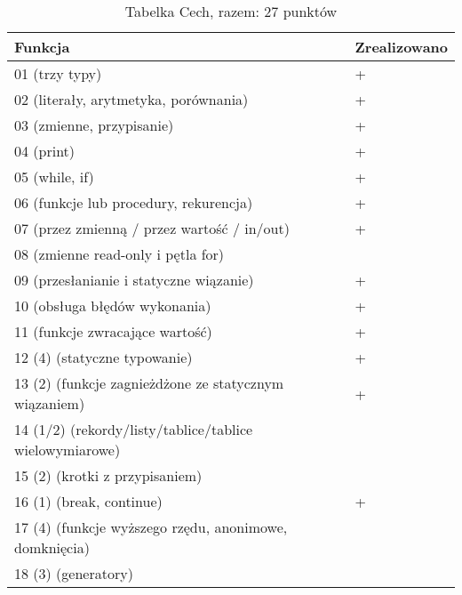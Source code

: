\documentclass[12pt]{article}
\begin{document}
\begin{table}[h]
    \centering
    \begin{tabular}{@{}ll@{}}
    \toprule
    Funkcja                                                          & Zrealizowano \\ \midrule
    01 (trzy typy)                                                   & +            \\
    02 (literały, arytmetyka, porównania)                            & +            \\
    03 (zmienne, przypisanie)                                        & +            \\
    04 (print)                                                       & +            \\
    05 (while, if)                                                   & +            \\
    06 (funkcje lub procedury, rekurencja)                           & +            \\
    07 (przez zmienną / przez wartość / in/out)                      & +            \\
    08 (zmienne read-only i pętla for)                               &              \\
    09 (przesłanianie i statyczne wiązanie)                          & +            \\
    10 (obsługa błędów wykonania)                                    & +            \\
    11 (funkcje zwracające wartość)                                  & +            \\
    12 (4) (statyczne typowanie)                                     & +            \\
    13 (2) (funkcje zagnieżdżone ze statycznym wiązaniem)            & +            \\
    14 (1/2) (rekordy/listy/tablice/tablice wielowymiarowe)          &              \\
    15 (2) (krotki z przypisaniem)                                   &              \\
    16 (1) (break, continue)                                         & +            \\
    17 (4) (funkcje wyższego rzędu, anonimowe, domknięcia)           &              \\
    18 (3) (generatory)                                              &              \\ \bottomrule
    \end{tabular}
    \caption{Tabelka Cech, razem: 27 punktów}
\end{table}
    

  
\end{document}
